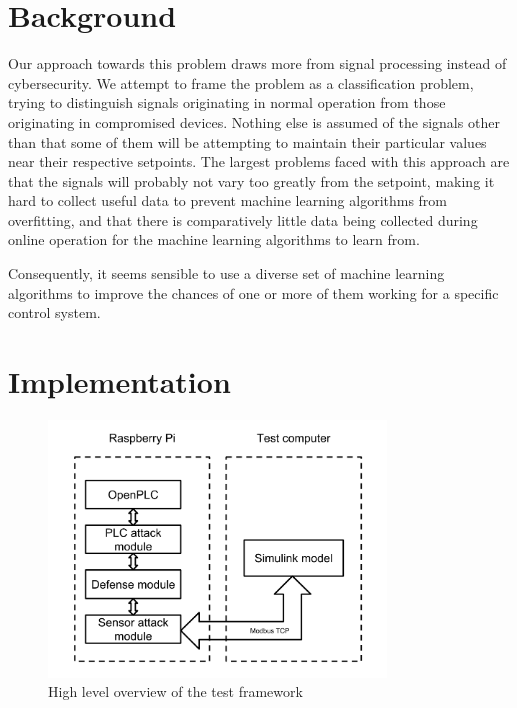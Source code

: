 \documentclass[10pt,twocolumn]{IEEEtran}
\begin{document}

\section{Background} \label{sec:bg}
Our approach towards this problem draws more from signal processing instead of cybersecurity.
We attempt to frame the problem as a classification problem, trying to distinguish signals originating in normal operation from those originating in compromised devices.
Nothing else is assumed of the signals other than that some of them will be attempting to maintain their particular values near their respective setpoints.
The largest problems faced with this approach are that the signals will probably not vary too greatly from the setpoint, making it hard to collect useful data to prevent machine learning algorithms from overfitting, and that there is comparatively little data being collected during online operation for the machine learning algorithms to learn from.

Consequently, it seems sensible to use a diverse set of machine learning algorithms to improve the chances of one or more of them working for a specific control system.

\section{Implementation} \label{sec:impl}
\begin{figure}
  \centering
  \includegraphics[width=0.8\textwidth]{csaw2017architecture.png}
  \caption{High level overview of the test framework}
  \label{fig:arch}
\end{figure}
\end{document}
